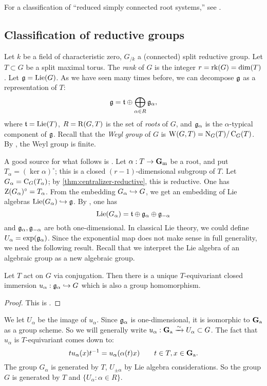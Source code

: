 For a classification of ``reduced simply connected root systems,'' see 
\cite[XXI 7.4.6]{sga3-iii}. 





\subsection{Classification of reductive groups}

Let $k$ be a field of characteristic zero, $G_{/k}$ a (connected) split 
reductive group. Let $T\subset G$ be a split maximal torus. The \emph{rank} of 
$G$ is the integer $r=\operatorname{rk}(G)=\dim(T)$. Let $\mathfrak{g}=\operatorname{Lie}(G)$. As we have seen 
many times before, we can decompose $\mathfrak{g}$ as a representation of $T$: 
\[
  \mathfrak{g}=\mathfrak{t}\oplus \bigoplus_{\alpha\in R} \mathfrak{g}_\alpha ,
\]
where $\mathfrak{t}=\operatorname{Lie}(T)$, $R=\operatorname{R}(G,T)$ is the set of \emph{roots} of $G$, and 
$\mathfrak{g}_\alpha$ is the $\alpha$-typical component of $\mathfrak{g}$. Recall that the 
\emph{Weyl group} of $G$ is $\operatorname{W}(G,T)=\operatorname{N}_G(T)/\operatorname{C}_G(T)$. By 
\cite[XII 2.1]{sga3-ii}, the Weyl group is finite. 

A good source for what follows is \cite[II.1]{jantzen-2003}. Let 
$\alpha:T\to \mathbf{G}_\mathrm{m}$ be a root, and put $T_\alpha=(\ker\alpha)^\circ$; this is a 
closed $(r-1)$-dimensional subgroup of $T$. Let 
$G_\alpha=\operatorname{C}_G(T_\alpha)$; by \autoref{thm:centralizer-reductive}, 
this is reductive. One has $\operatorname{Z}(G_\alpha)^\circ=T_\alpha$. From the 
embedding $G_\alpha\hookrightarrow G$, we get an embedding of Lie algebras 
$\operatorname{Lie}(G_\alpha)\hookrightarrow \mathfrak{g}$. By \cite[IX 3.5]{sga3-iii}, one has 
\[
  \operatorname{Lie}(G_\alpha) = \mathfrak{t}\oplus \mathfrak{g}_\alpha \oplus \mathfrak{g}_{-\alpha} 
\]
and $\mathfrak{g}_\alpha,\mathfrak{g}_{-\alpha}$ are both one-dimensional. In classical Lie 
theory, we could define $U_\alpha=\exp(\mathfrak{g}_\alpha)$. Since the exponential map 
does not make sense in full generality, we need the following result. Recall 
that we interpret the Lie algebra of an algebraic group as a new algebraic 
group. 

\begin{theorem}
Let $T$ act on $G$ via conjugation. Then there is a unique $T$-equivariant 
closed immersion $u_\alpha:\mathfrak{g}_\alpha\hookrightarrow G$ which is also a group 
homomorphism. 
\end{theorem}
\begin{proof}
This is \cite[XXII 1.1.i]{sga3-iii}. 
\end{proof}

We let $U_\alpha$ be the image of $u_\alpha$. Since $\mathfrak{g}_\alpha$ is 
one-dimensional, it is isomorphic to $\mathbf{G}_\mathrm{a}$ as a group scheme. So we will 
generally write $u_\alpha:\mathbf{G}_\mathrm{a}\xrightarrow\sim U_\alpha\subset G$. The fact that 
$u_\alpha$ is $T$-equivariant comes down to: 
\[
  t u_\alpha(x) t^{-1} = u_\alpha(\alpha(t) x) \qquad t\in T, x\in \mathbf{G}_\mathrm{a} .
\]
The group $G_\alpha$ is generated by $T$, $U_{\pm\alpha}$ by Lie 
algebra considerations. So the group $G$ is generated by $T$ and 
$\{U_\alpha:\alpha\in R\}$. 

